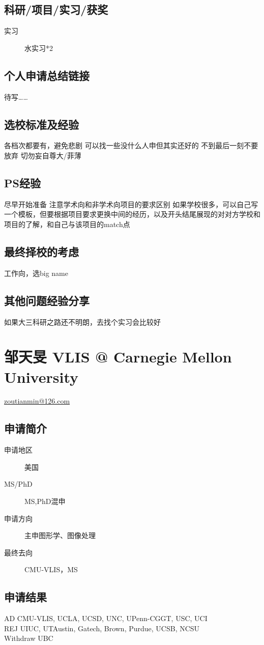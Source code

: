 \documentclass[11pt,fleqn,openany]{book} %
\begin{document}
\subsection*{科研/项目/实习/获奖}
\begin{description}
\item[实习] 水实习*2
\end{description}
\subsection*{个人申请总结链接}
待写……
\subsection*{选校标准及经验}
各档次都要有，避免悲剧
可以找一些没什么人申但其实还好的
不到最后一刻不要放弃
切勿妄自尊大/菲薄
\subsection*{PS经验}
尽早开始准备
注意学术向和非学术向项目的要求区别
如果学校很多，可以自己写一个模板，但要根据项目要求更换中间的经历，以及开头结尾展现的对对方学校和项目的了解，和自己与该项目的match点
\subsection*{最终择校的考虑}
工作向，选big name
\subsection*{其他问题经验分享}
如果大三科研之路还不明朗，去找个实习会比较好
\clearpage
\section{邹天旻 VLIS @ Carnegie Mellon University}
\hfill \href{mailto:zoutianmin@126.com}{zoutianmin@126.com}

\noindent\begin{minipage}[t]{0.45\textwidth}
\subsection*{申请简介}
\begin{description}
\item[申请地区] 美国
\item[MS/PhD] MS,PhD混申
\item[申请方向] 主申图形学、图像处理
\item[最终去向] CMU-VLIS，MS
\end{description}
\end{minipage}
\hfill
\begin{minipage}[t]{0.45\textwidth}
\subsection*{申请结果}
\noindent AD CMU-VLIS, UCLA, UCSD, UNC, UPenn-CGGT, USC, UCI\\
REJ UIUC, UTAustin, Gatech, Brown, Purdue, UCSB, NCSU\\
Withdraw UBC
\end{minipage}
\end{document}
